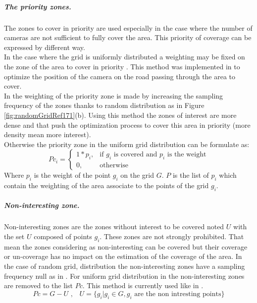 \subparagraph{The priority zones.}
The zones to cover in priority are used especially in the case where the number of cameras are not sufficient to fully cover the area. This priority of coverage can be expressed by different way. \\
In the case where the grid is uniformly distributed a weighting may be fixed on the zone of the area to cover in priority \cite{141*akbarzadeh2013,84*xu2011}. This method was implemented in \citep{141*akbarzadeh2013} to optimize the position of the camera on the road passing through the area to cover. \\
In \citep{171*horster2006} the weighting of the priority zone is made by increasing the sampling frequency of the zones thanks to random distribution  as in Figure \ref{fig:randomGridRef171}(b). Using this method the zones of interest are more dense and that push the optimization process to cover this area in priority (more density mean more interest).\\
Otherwise the priority zone in the uniform grid distribution can be formulate as: 
  \begin{equation}\label{eq:PciP}
Pc_i= \begin{cases} 1*p_i, & \mbox{if } g_i\mbox{ is covered and  $p_i$ is the weight} \\ 0, & \mbox{otherwise}  \end{cases}
\end{equation}
Where $p_i$ is the weight of the point $g_i$ on the grid $G$. $P $ is the list of $p_i$ which contain the weighting of the area associate to the points of the grid $g_i$. \\

\subparagraph{Non-interesting zone.}
Non-interesting zones are the zones without interest to be covered noted $U$ with the set $U$ composed of points $g_i$. These zones are not strongly prohibited. That mean the zones considering as non-interesting can be covered but their coverage or un-coverage has no impact on the estimation of the coverage of the area. In the case of random grid, distribution the non-interesting zones have a sampling frequency null as in \citep{141*akbarzadeh2013}. For uniform grid distribution in the non-interesting zones are removed to the list $Pc$. This method is currently used like in \cite{22*zhao2008,170*yabuta2008,141*akbarzadeh2013,171*horster2006,84*xu2011} . 
\begin{equation}\label{eq:setU}
Pc=G-U \mbox{ ,    }  \mbox{ }U= \{ g_i | g_i \in G, g_i \mbox{ are the non intresting points} \}
\end{equation}



